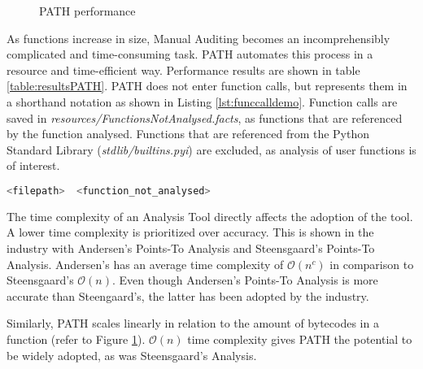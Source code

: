     \begin{figure}[H]
        \centering
        \caption{\acs{PATH} performance}
        \label{fig:bytecodevstimeperf}
    \end{figure}

    \par As functions increase in size, Manual Auditing becomes an incomprehensibly complicated and time-consuming task. \acs{PATH} automates this process in a resource and time-efficient way. Performance results are shown in table \ref{table:resultsPATH}. \acs{PATH} does not enter function calls, but represents them in a shorthand notation as shown in Listing \ref{lst:funccalldemo}. Function calls are saved in \textit{resources/FunctionsNotAnalysed.facts}, as functions that are referenced by the function analysed. Functions that are referenced from the Python Standard Library (\textit{stdlib/builtins.pyi}) are excluded, as analysis of user functions is of interest.

    \begin{lstlisting}[language=bash,caption=Boilerplate of \textit{resources/FunctionsNotAnalysed.facts},numbers=none,label=lst:funccalldemo]
                <filepath>  <function_not_analysed>
    \end{lstlisting}

    \par The time complexity of an Analysis Tool directly affects the adoption of the tool. A lower time complexity is prioritized over accuracy. This is shown in the industry with Andersen's Points-To Analysis and Steensgaard's Points-To Analysis. Andersen's has an average time complexity of   
    $\mathcal{O}(n^c)$ in comparison to Steensgaard's $\mathcal{O}(n)$. Even though Andersen's Points-To Analysis is more accurate than Steengaard's, the latter has been adopted by the industry.
    \par Similarly, \acs{PATH} scales linearly in relation to the amount of bytecodes in a function (refer to Figure \ref{fig:bytecodevstimeperf}). $\mathcal{O}(n)$ time complexity gives \acs{PATH} the potential to be widely adopted, as was Steensgaard's Analysis. 
    
